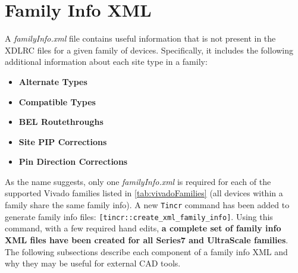 \newpage
\section{Family Info XML} \label{sec:familyInfo}

A \textit{familyInfo.xml} file contains useful information that is
not present in the XDLRC files for a given family of devices. Specifically, it
includes the following additional information about each site type in a family:

\begin{multicols}{2} 
	\begin {itemize}
      \item \textbf{Alternate Types}
      \item \textbf{Compatible Types}
      \item \textbf{BEL Routethroughs}
      \item \textbf{Site PIP Corrections}
      \item \textbf{Pin Direction Corrections}
	\end{itemize}
\end{multicols}

\noindent 
As the name suggests,  only one \textit{familyInfo.xml} is required for each of
the supported Vivado families listed in \autoref{tab:vivadoFamilies} (all
devices within a family share the same family info).  A new \texttt{Tincr}
command has been added to generate family info files:
\texttt{[tincr::create\_xml\_family\_info]}.  Using this command, with a few
required hand edits, \textbf{a complete set of family info XML files have been
created for all Series7 and UltraScale families}.  The following subsections
describe each component of a family info XML and why they may be useful for
external CAD tools.

